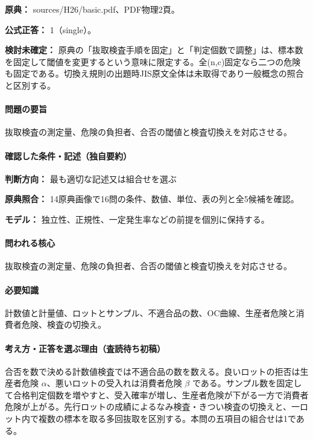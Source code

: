 \noindent\textbf{原典：} sources/H26/basic.pdf、PDF物理2頁。

\textbf{公式正答：} 1（single）。

\par\textbf{検討未確定：} 原典の「抜取検査手順を固定」と「判定個数で調整」は、標本数を固定して閾値を変更するという意味に限定する。全(n,c)固定なら二つの危険も固定である。切換え規則の出題時JIS原文全体は未取得であり一般概念の照合と区別する。

\paragraph{問題の要旨} 抜取検査の測定量、危険の負担者、合否の閾値と検査切換えを対応させる。

\paragraph{確認した条件・記述（独自要約）}\mbox{}\par

\noindent\textbf{判断方向：} 最も適切な記述又は組合せを選ぶ\par

\noindent\textbf{原典照合：} 14原典画像で16問の条件、数値、単位、表の列と全5候補を確認。\par

\noindent\textbf{モデル：} 独立性、正規性、一定発生率などの前提を個別に保持する。\par

\paragraph{問われる核心} 抜取検査の測定量、危険の負担者、合否の閾値と検査切換えを対応させる。

\paragraph{必要知識} 計数値と計量値、ロットとサンプル、不適合品の数、OC曲線、生産者危険と消費者危険、検査の切換え。

\paragraph{考え方・正答を選ぶ理由（査読待ち初稿）} 合否を数で決める計数値検査では不適合品の数を数える。良いロットの拒否は生産者危険 \(\alpha\)、悪いロットの受入れは消費者危険 \(\beta\) である。サンプル数を固定して合格判定個数を増やすと、受入確率が増し、生産者危険が下がる一方で消費者危険が上がる。先行ロットの成績によるなみ検査・きつい検査の切換えと、一ロット内で複数の標本を取る多回抜取を区別する。本問の五項目の組合せは1である。

